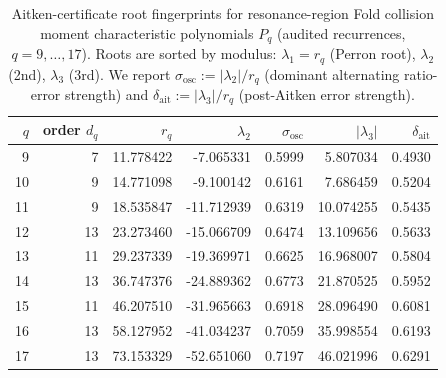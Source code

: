 \begin{table}[H]
\centering
\scriptsize
\setlength{\tabcolsep}{4pt}
\caption{Aitken-certificate root fingerprints for resonance-region Fold collision moment characteristic polynomials $P_q$ (audited recurrences, $q=9,\dots,17$). Roots are sorted by modulus: $\lambda_1=r_q$ (Perron root), $\lambda_2$ (2nd), $\lambda_3$ (3rd). We report $\sigma_{\mathrm{osc}}:=|\lambda_2|/r_q$ (dominant alternating ratio-error strength) and $\delta_{\mathrm{ait}}:=|\lambda_3|/r_q$ (post-Aitken error strength).}
\label{tab:fold_collision_resonance_aitken_certificate_q9_17}
\begin{tabular}{r r r r r r r}
\toprule
$q$ & order $d_q$ & $r_q$ & $\lambda_2$ & $\sigma_{\mathrm{osc}}$ & $|\lambda_3|$ & $\delta_{\mathrm{ait}}$\\
\midrule
9 & 7 & 11.778422 & -7.065331 & 0.5999 & 5.807034 & 0.4930\\
10 & 9 & 14.771098 & -9.100142 & 0.6161 & 7.686459 & 0.5204\\
11 & 9 & 18.535847 & -11.712939 & 0.6319 & 10.074255 & 0.5435\\
12 & 13 & 23.273460 & -15.066709 & 0.6474 & 13.109656 & 0.5633\\
13 & 11 & 29.237339 & -19.369971 & 0.6625 & 16.968007 & 0.5804\\
14 & 13 & 36.747376 & -24.889362 & 0.6773 & 21.870525 & 0.5952\\
15 & 11 & 46.207510 & -31.965663 & 0.6918 & 28.096490 & 0.6081\\
16 & 13 & 58.127952 & -41.034237 & 0.7059 & 35.998554 & 0.6193\\
17 & 13 & 73.153329 & -52.651060 & 0.7197 & 46.021996 & 0.6291\\
\bottomrule
\end{tabular}
\end{table}
